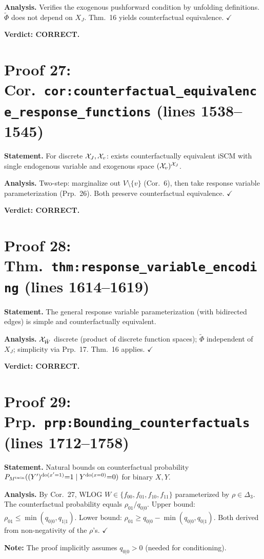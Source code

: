 \documentclass{article}
\begin{document}
\textbf{Analysis.} Verifies the exogenous pushforward condition by unfolding
definitions.  $\tilde\Phi$ does not depend on $X_J$.
Thm.~16 yields counterfactual equivalence.  $\checkmark$

\textbf{Verdict: CORRECT.}

\section{Proof 27: Cor.\ \texttt{cor:counterfactual\_equivalence\_response\_functions}
(lines 1538--1545)}
\textbf{Statement.} For discrete $\mathcal{X}_J,\mathcal{X}_v$: exists counterfactually
equivalent iSCM with single endogenous variable and exogenous space
$(\mathcal{X}_v)^{\mathcal{X}_J}$.

\textbf{Analysis.} Two-step: marginalize out $V\setminus\{v\}$ (Cor.~6),
then take response variable parameterization (Prp.~26).  Both preserve
counterfactual equivalence.  $\checkmark$

\textbf{Verdict: CORRECT.}

\section{Proof 28: Thm.\ \texttt{thm:response\_variable\_encoding}
(lines 1614--1619)}
\textbf{Statement.} The general response variable parameterization (with
bidirected edges) is simple and counterfactually equivalent.

\textbf{Analysis.} $\mathcal{X}_{\tilde W}$ discrete (product of discrete function
spaces); $\tilde\Phi$ independent of $X_J$; simplicity via
Prp.~17.  Thm.~16 applies.  $\checkmark$

\textbf{Verdict: CORRECT.}

\section{Proof 29: Prp.\ \texttt{prp:Bounding\_counterfactuals}
(lines 1712--1758)}
\textbf{Statement.} Natural bounds on counterfactual probability
$P_{M^{\mathrm{twin}}}((Y')^{\operatorname{do}(x'=1)}{=}1\mid Y^{\operatorname{do}(x=0)}{=}0)$
for binary $X,Y$.

\textbf{Analysis.} By Cor.~27, WLOG $W\in\{f_{00},f_{01},f_{10},f_{11}\}$
parameterized by $\rho\in\Delta_3$.  The counterfactual probability equals
$\rho_{01}/q_{0|0}$.  Upper bound: $\rho_{01}\le\min(q_{0|0},q_{1|1})$.
Lower bound: $\rho_{01}\ge q_{0|0}-\min(q_{0|0},q_{0|1})$.  Both derived
from non-negativity of the $\rho$'s.  $\checkmark$

\textbf{Note:} The proof implicitly assumes $q_{0|0}>0$ (needed for conditioning).
\end{document}
